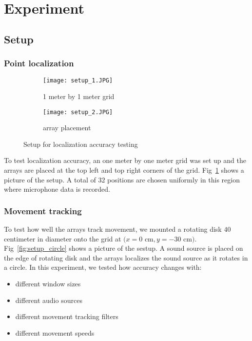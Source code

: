 \section{Experiment}
\subsection{Setup}
\subsubsection{Point localization}

\begin{figure}[]
  \centering
  \begin{subfigure}[]{.2\textwidth}
    \texttt{[image: setup\_1.JPG]}
    \caption{1 meter by 1 meter grid}
  \end{subfigure}
  \begin{subfigure}[]{.2\textwidth}
    \texttt{[image: setup\_2.JPG]}
    \caption{array placement}
  \end{subfigure}
  \caption{Setup for localization accuracy testing}
  \label{fig:setup_point}
\end{figure}

To test localization accuracy, an one meter by one meter grid was set up and the arrays are placed at the top left and top right corners of the grid. Fig~\ref{fig:setup_point} shows a picture of the setup. A total of $32$ positions are chosen uniformly in this region where microphone data is recorded.

\subsubsection{Movement tracking}
To test how well the arrays track movement, we mounted a rotating disk $40$ centimeter in diameter onto the grid at $(x=0$ cm$, y=-30$ cm$)$. Fig~\ref{fig:setup_circle} shows a picture of the sestup. A sound source is placed on the edge of rotating disk and the arrays localizes the sound source as it rotates in a circle. In this experiment, we tested how accuracy changes with:
\begin{itemize}
\item different window sizes
\item different audio sources
\item different movement tracking filters
\item different movement speeds
\end{itemize}

